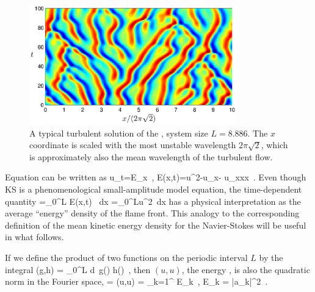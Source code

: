 \begin{figure}[t] \label{f:ks_largeL}
\begin{center}
\includegraphics[width=0.8\textwidth]{figs/ks_largeL.eps}
\end{center}
\caption{
A typical turbulent solution of the \KSe, system size
$L=8.886$.  The $x$
coordinate is scaled with the most unstable wavelength
$2\pi\sqrt{2}$, 
which is approximately also the mean wavelength of the turbulent flow. 
     }
\end{figure}

Equation  can be written as %
\beq
    u_t=E_x
        \,,\qquad
    E(x,t)=u^2-u_{x}- u_{xxx}
    \,.
Even though KS is a phenomenological
small-amplitude model equation, the time-dependent quantity
\beq
    \expctE=\int_0^{L} E(x,t) \, dx
    =\int_0^{L}u^2\, dx
\label{ksEnergy}
\eeq
{}
has a physical interpretation
as the average ``energy'' density of the flame front.
This analogy to the corresponding definition of the
mean kinetic energy density for
the Navier-Stokes will be useful in what follows.

If we define the product of two functions on the
periodic interval $L$ by the integral
\beq
        (g,h) = \int_0^{L} d\pSpace\,
        g(\pSpace) h(\pSpace)
        \,,
        \label{rpo:innerProd}
\eeq
then $(u,u)$, the energy ,
is also the quadratic norm in the Fourier space,
\beq
\expctE = (u,u) = \sum_{k=1}^{\infty} E_k
\,,\qquad
E_k = %
    |a_k|^2
\,.


